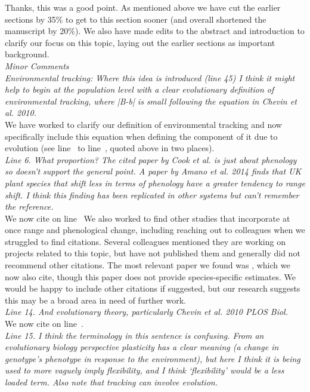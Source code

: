 \documentclass[11pt,letterpaper]{article}
\newcommand{\lr}[1]{line~\lineref{#1}}
\begin{document}
Thanks, this was a good point. As mentioned above we have cut the earlier sections by 35\% to get to this section sooner (and overall shortened the manuscript by 20\%). We also have made edits to the abstract and introduction to clarify our focus on this topic, laying out the earlier sections as important background.\\

\emph{Minor Comments\\
Environmental tracking: Where this idea is introduced (line 45) I think it might help to
begin at the population level with a clear evolutionary definition of environmental tracking,
where |B-b| is small following the equation in Chevin et al. 2010.}\\

We have worked to clarify our definition of environmental tracking and now specifically include this equation when defining the component of it due to evolution (see \lr{Bminusbstart} to \lr{moretrackE}, quoted above in two places). \\

\emph{Line 6. What proportion? The cited paper by Cook et al. is just about phenology so doesn't
support the general point. A paper by Amano et al. 2014 finds that UK plant species that
shift less in terms of phenology have a greater tendency to range shift. I think this finding
has been replicated in other systems but can't remember the reference.}\\

We now cite \citet{amano2014} on \lr{r4misc} We also worked to find other studies that incorporate at once range and phenological change, including reaching out to colleagues when we struggled to find citations. Several colleagues mentioned they are working on projects related to this topic, but have not published them and generally did not recommend other citations. The most relevant paper we found was \citet{socolar2017}, which we now also cite, though this paper does not provide species-specific estimates. We would be happy to include other citations if suggested, but our research suggests this may be a broad area in need of further work. \\

\emph{Line 14. And evolutionary theory, particularly Chevin et al. 2010 PLOS Biol.}\\

We now cite \citet{chevin2010} on \lr{r4misc1}.\\

\emph{Line 15. I think the terminology in this sentence is confusing. From an evolutionary biology
perspective plasticity has a clear meaning (a change in genotype's phenotype in response to
the environment), but here I think it is being used to more vaguely imply flexibility, and I
think `flexibility' would be a less loaded term. Also note that tracking can involve
evolution.}\\
\end{document}
